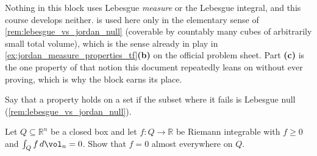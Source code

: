 \begin{ainote}
Nothing in this block uses Lebesgue \emph{measure} or the Lebesgue integral, and this course
develops neither.  is used here only in the elementary sense of
\cref{rem:lebesgue_vs_jordan_null} (coverable by countably many cubes of arbitrarily small total
volume), which is the sense already in play in \cref{ex:jordan_measure_properties_tf}\textbf{(b)} on the official problem
sheet. Part \textbf{(c)} is the one property of that notion this document repeatedly leans on
without ever proving, which is why the block earns its place.
\end{ainote}

\begin{exercise}
\label{ex:vanishing_integral_forces_zero_ae}
Say that a property holds  on a set if the subset where it fails is
Lebesgue null (\cref{rem:lebesgue_vs_jordan_null}).

Let $Q \subseteq \mathbb{R}^n$ be a closed box and let $f : Q \to \mathbb{R}$ be Riemann
integrable with $f \geq 0$ and $\int_Q f \,d\vol_n = 0$. Show that $f = 0$ almost everywhere
on $Q$.
\end{exercise}

